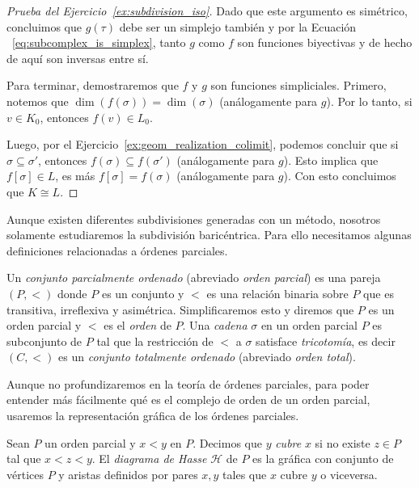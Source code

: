 \documentclass{standalone}
\begin{document}
\begin{proof}[Prueba del Ejercicio~\ref{ex:subdivision_iso}]
		Dado que este argumento es simétrico, concluimos que $g(\tau)$ debe ser un simplejo también y por la Ecuación ~\ref{eq:subcomplex_is_simplex}, tanto $g$ como $f$ son funciones biyectivas y de hecho de aquí son inversas entre sí.
		
		Para terminar, demostraremos que $f$ y $g$ son funciones simpliciales. Primero, notemos que $\dim(f(\sigma))=\dim(\sigma)$ (análogamente para $g$). Por lo tanto, si $v\in K_{0}$, entonces $f(v)\in L_{0}$.
		
		Luego, por el Ejercicio~\ref{ex:geom_realization_colimit}, podemos concluir que si $\sigma\subseteq\sigma'$, entonces $f(\sigma)\subseteq f(\sigma')$ (análogamente para $g$). Esto implica que $f[\sigma]\in L$, es más $f[\sigma]=f(\sigma)$ (análogamente para $g$). Con esto concluimos que $K\cong L$.
	\end{proof}

	Aunque existen diferentes subdivisiones generadas con un método, nosotros solamente estudiaremos la subdivisión baricéntrica. Para ello necesitamos algunas definiciones relacionadas a órdenes parciales.
	
	\begin{definition}\label{defn:poset}
		Un \emph{conjunto parcialmente ordenado} (abreviado \emph{orden parcial}) es una pareja $(P,<)$ donde $P$ es un conjunto y $<$ es una relación binaria sobre $P$ que es transitiva, irreflexiva y asimétrica. Simplificaremos esto y diremos que $P$ es un orden parcial y $<$ es el \emph{orden} de $P$. Una \emph{cadena} $\sigma$ en un orden parcial $P$ es subconjunto de $P$ tal que la restricción de $<$ a $
		\sigma$ satisface \emph{tricotomía}, es decir $(C,<)$ es un \emph{conjunto totalmente ordenado} (abreviado \emph{orden total}).
	\end{definition}
	Aunque no profundizaremos en la teoría de órdenes parciales, para poder entender más fácilmente qué es el complejo de orden de un orden parcial, usaremos la representación gráfica de los órdenes parciales. 
	\begin{definition}\label{defn:Hasse}
		Sean $P$ un orden parcial y $x<y$ en $P$. Decimos que $y$ \emph{cubre} $x$ si no existe $z\in P$ tal que $x<z<y$. El \emph{diagrama de Hasse} $\mathcal{H}$ de $P$ es la gráfica con conjunto de vértices $P$ y aristas definidos por pares ${x,y}$ tales que $x$ cubre $y$ o viceversa.
	\end{definition}
	
\end{document}
